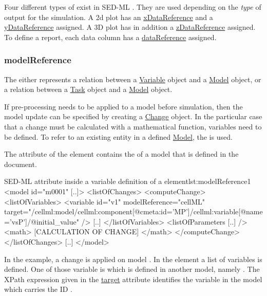 Four different types of  exist in SED-ML \LoneVone. They are used depending on the \emph{type} of output for the simulation. A 2d plot has an \hyperref[sec:xDataReference]{xDataReference} and a \hyperref[sec:yDataReference]{yDataReference} assigned. A 3D plot has in addition a \hyperref[sec:zDataReference]{zDataReference} assigned. To define a report, each data column has a \hyperref[sec:dataReference1]{dataReference} assigned.

\subsubsection{modelReference}
\label{sec:modelReference}
%
The  either represents a relation between a \hyperref[class:variable]{Variable} object and a \hyperref[class:Model]{Model} object, or  a relation between a \hyperref[class:task]{Task} object and a \hyperref[class:Model]{Model} object.

If pre-processing needs to be applied to a model before simulation, then the model update can be specified by creating a \hyperref[class:Change]{Change} object. In the particular case that a change must be calculated with a mathematical function, variables need to be defined. To refer to an existing entity in a defined \hyperref[class:model]{Model}, the  is used. 

The  attribute of the  element contains the  of a model that is defined in the document. 
%
\begin{myXmlLst}{SED-ML  attribute inside a variable definition of a   element}{lst:modelReference1}
<model id="m0001" [..]>
 <listOfChanges>
   <computeChange>
    <listOfVariables>
     <variable id="v1" modelReference="cellML" target="/cellml:model/cellml:component[@cmeta:id='MP']/cellml:variable[@name='vsP']/@initial_value" />
     [..]
    </listOfVariables>
    <listOfParameters [..] />
    <math>
     [CALCULATION OF CHANGE]
    </math>
   </computeChange>
 </listOfChanges>
 [..]
</model>
\end{myXmlLst}
%
In the example, a change is  applied on model . In the  element a list of variables is defined. One of those variable is  which is defined in another model, namely . 
The XPath expression given in the \hyperref[sec:target]{target} attribute identifies the variable in the model which carries the ID .

